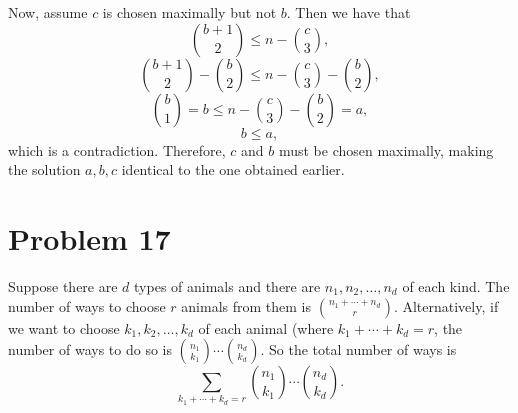 \documentclass{article}
\begin{document}
Now, assume $c$ is chosen maximally but not $b$. Then we have that
$$\binom{b + 1}{2} \le n - \binom{c}{3},$$
$$\binom{b + 1}{2} - \binom{b}{2} \le n - \binom{c}{3} - \binom{b}{2},$$
$$\binom{b}{1} = b \le n - \binom{c}{3} - \binom{b}{2} = a,$$
$$b \le a,$$
which is a contradiction. Therefore, $c$ and $b$ must be chosen maximally, making the solution $a, b, c$ identical to the one obtained earlier.

\section*{Problem 17}
Suppose there are $d$ types of animals and there are $n_1, n_2, \ldots, n_d$ of each kind. The number of ways to choose $r$ animals from them is $\binom{n_1 + \cdots + n_d}{r}$. Alternatively, if we want to choose $k_1, k_2, \ldots, k_d$ of each animal (where $k_1 + \cdots + k_d = r$, the number of ways to do so is $\binom{n_1}{k_1}\cdots\binom{n_d}{k_d}$. So the total number of ways is
$$\sum_{k_1 + \cdots + k_d = r} \binom{n_1}{k_1}\cdots\binom{n_d}{k_d}.$$
\end{document}
